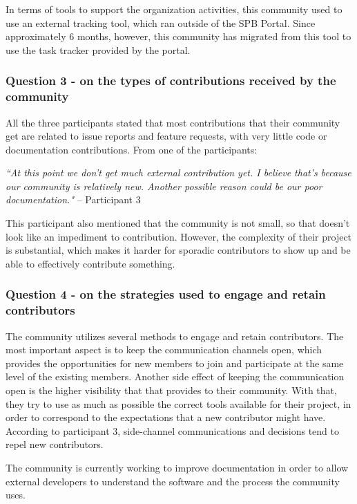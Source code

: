 \documentclass{sigchi}
\begin{document}
In terms of tools to support the organization activities, this community used to use an external tracking tool, which ran outside of the SPB Portal. Since approximately 6 months, however, this community has migrated from this tool to use the task tracker provided by the portal.

\subsubsection{Question 3 - on the types of contributions received by the community}

All the three participants stated that most contributions that their community get are related to issue reports and feature requests, with very little code or documentation contributions. From one of the participants:

\begin{displayquote}
\textit{``At this point we don't get much external contribution yet. I believe that's because our community is relatively new. Another possible reason could be our poor documentation."} – Participant 3
\end{displayquote}

This participant also mentioned that the community is not small, so that doesn't look like an impediment to contribution. However, the complexity of their project is substantial, which makes it harder for sporadic contributors to show up and be able to effectively contribute something.

\subsubsection{Question 4 - on the strategies used to engage and retain contributors}

The community utilizes several methods to engage and retain contributors. The most important aspect is to keep the communication channels open, which provides the opportunities for new members to join and participate at the same level of the existing members. Another side effect of keeping the communication open is the higher visibility that that provides to their community. With that, they try to use as much as possible the correct tools available for their project, in order to correspond to the expectations that a new contributor might have. According to participant 3, side-channel communications and decisions tend to repel new contributors.

The community is currently working to improve documentation in order to allow external developers to understand the software and the process the community uses.
\end{document}
